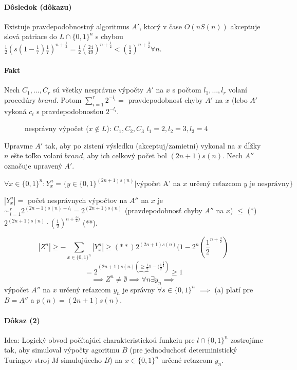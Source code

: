 \documentclass{article}
\begin{document}
\paragraph{Dôsledok (dôkazu)} Existuje pravdepodobnostný algoritmus $A'$, ktorý
v čase $O(nS(n))$ akceptuje slová patriace do $L \cap \{0,1\}^n$ s chybou
$\frac{1}{2}(s(1-\frac{1}{7})\frac{1}{7})^{n+\frac{1}{2}} =
\frac{1}{2}\left(\frac{24}{49}\right)^{n+\frac{1}{2}} <
\left(\frac{1}{2}\right)^{n+\frac{3}{2}} \forall n$.

\paragraph{Fakt} Nech $C_1, \ldots, C_r$ sú všetky nesprávne výpočty $A'$ na $x$
s počtom $l_1, \ldots, l_r$ volaní procedúry $brand$. Potom $\sum_{i=1}^{r}
2^{-l_i} = $ pravdepodobnosť chyby  $A'$ na $x$ (lebo $A'$ vykoná $c_i$ s
pravdepodobnosťou $2^{-l_i}$.
\begin{figure}
nesprávny výpočet ($x\notin L$): $C_1, C_2, C_3$
$ l_1 = 2, l_2 = 3, l_3 = 4 $
\end{figure}

Upravme $A'$ tak, aby po zistení výsledku (akceptuj/zamietni) vykonal na $x$
dĺžky $n$ ešte toľko volaní $brand$, aby ich celkový počet bol $(2n+1)s(n)$.
Nech $A''$ označuje upravený $A'$.

$\forall x \in \{0,1\}^n: Y_x^n = \{ y \in \{ 0,1 \}^{(2n+1)s(n)} |
\mbox{výpočet A' na $x$ určený reťazcom  $y$ je nesprávny}\}$

$|Y_x^n| = $ počet nesprávnych výpočtov na $A''$  na $x$ je $\sim_{i=1}^{r}
2^{(2n-1)s(n) - l_i} = 2^{(2n+1)s(n)}$ (pravdepodobnosť chyby $A''$ na $x$)
$\leq$ (*) $2^{(2n+1)s(n)}\cdot (\frac{1}{2})^{n+\frac{3}{2})}$ (**).

$$ |Z^n| \geq - \sum_{x\in\{0,1\}^n} |Y_x^n| \geq (**) 2^{(2n+1)s(n)}
(1-2^n(\frac{1}{2}^{n+\frac{3}{2}})$$
$$ = 2^{(2n+1)s(n)(\underbrace{\geq
\frac{1}{2}}{1-(\frac{1}{2}^{\frac{3}{2}}})} \geq 1$$ 
$$ \implies Z^n \neq \emptyset \implies \forall n \exists y_n \implies$$ výpočet
$A''$ na $x$ určený reťazcom $y_n$ je správny $\forall s \in \{0,1\}^n$
$\implies$
(a) platí pre $B = A''$ a $p(n)  = (2n+1)s(n)$.

\paragraph{Dôkaz (2)} Idea: Logický obvod počítajúci charakteristickoú funkciu
pre $l \cap \{0,1\}^n$ zostrojíme tak, aby simuloval výpočty agoritmu $B$ (pre
jednoduchosť deterministický Turingov stroj $M$ simulujúceho $B$) na $x \in
\{0,1\}^n$ určené reťazcom $y_n$.
\end{document}

